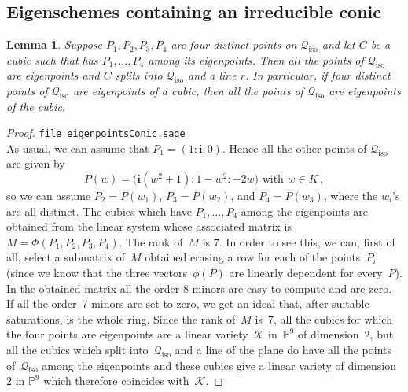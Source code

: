 \documentclass{amsart}
\theoremstyle{plain}
\newtheorem{lemma}{Lemma}[section]
\theoremstyle{definition}
\newcommand{\p}{\mathbb{P}}
\newcommand{\iso}{\mathcal{Q}_{\mathrm{iso}}}
\newcommand{\iii}{\textbf{i}}
\begin{document}
\subsection{Eigenschemes containing an irreducible conic}
\begin{lemma}
\label{lemma:fourOnIso}
Suppose $P_1, P_2, P_3, P_4$ are four distinct points on $\iso$ and let
$C$ be a cubic such that has $P_1, \dots, P_4$ among its eigenpoints.
Then all the points of $\iso$ are eigenpoints and $C$ splits into $\iso$
and a line $r$. In particular, if four
distinct points of $\iso$ are eigenpoints of a cubic, then all the
points of $\iso$ are eigenpoints of the cubic.
\end{lemma}
\begin{proof}
\verb+file eigenpointsConic.sage+\\
As usual, we can assume that $P_1 = (1: \iii: 0)$. Hence all the other points
of $\iso$ are given by
%
\[
  P(w) = \bigl(\iii(w^2 + 1): 1 - w^2: -2w\bigr) \text{ with } w \in K \,,
\]
%
so we can assume
$P_2 = P(w_1)$, $P_3 = P(w_2)$, and $P_4 = P(w_3)$, where the $w_i$'s are
all distinct. The cubics which have $P_1, \dots, P_4$ among the eigenpoints
are obtained from the linear system whose associated matrix is
$M = \Phi(P_1, P_2, P_3, P_4)$. The rank of~$M$ is $7$. In order to see this,
we can, first of all, select a submatrix of~$M$ obtained erasing a
row for each of the points~$P_i$ (since we know that the three vectors~$\phi(P)$ are linearly dependent for every~$P$). In the obtained matrix
all the order $8$ minors are easy to compute and are zero.
If all the order~$7$
minors are set to zero, we get an ideal that, after suitable saturations,
is the whole ring. Since the rank of~$M$ is~$7$, all the cubics for which the
four points are eigenpoints are a linear variety~$\mathcal{K}$
in~$\p^9$
of dimension~$2$, but all the cubics which split into~$\iso$ and a line
of the plane do have all the points of~$\iso$ among the eigenpoints and
these cubics give a linear variety of dimension~$2$ in $\p^9$
which therefore coincides with~$\mathcal{K}$.
\end{proof}
\end{document}
